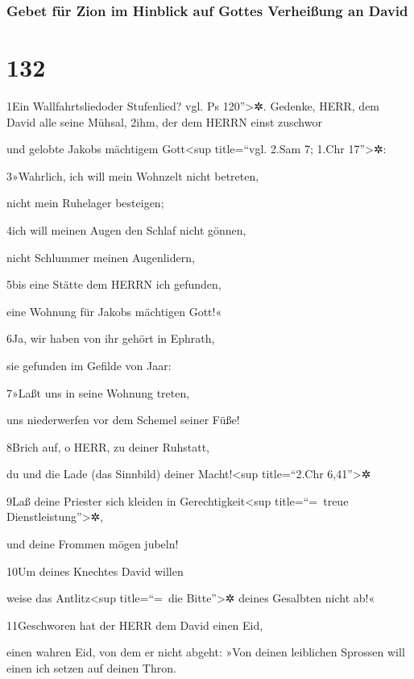 \hypertarget{gebet-fuxfcr-zion-im-hinblick-auf-gottes-verheiuxdfung-an-david}{%
\subsubsection{Gebet für Zion im Hinblick auf Gottes Verheißung an
David}\label{gebet-fuxfcr-zion-im-hinblick-auf-gottes-verheiuxdfung-an-david}}

\hypertarget{section-131}{%
\section{132}\label{section-131}}

1Ein Wallfahrtsliedoder Stufenlied? vgl. Ps 120''\textgreater✲. Gedenke,
HERR, dem David alle seine Mühsal, 2ihm, der dem HERRN einst zuschwor

und gelobte Jakobs mächtigem Gott\textless sup title=``vgl. 2.Sam 7;
1.Chr 17''\textgreater✲:

3»Wahrlich, ich will mein Wohnzelt nicht betreten,

nicht mein Ruhelager besteigen;

4ich will meinen Augen den Schlaf nicht gönnen,

nicht Schlummer meinen Augenlidern,

5bis eine Stätte dem HERRN ich gefunden,

eine Wohnung für Jakobs mächtigen Gott!«

6Ja, wir haben von ihr gehört in Ephrath,

sie gefunden im Gefilde von Jaar:

7»Laßt uns in seine Wohnung treten,

uns niederwerfen vor dem Schemel seiner Füße!

8Brich auf, o HERR, zu deiner Ruhstatt,

du und die Lade (das Sinnbild) deiner Macht!\textless sup title=``2.Chr
6,41''\textgreater✲

9Laß deine Priester sich kleiden in Gerechtigkeit\textless sup
title=``=~treue Dienstleistung''\textgreater✲,

und deine Frommen mögen jubeln!

10Um deines Knechtes David willen

weise das Antlitz\textless sup title=``=~die Bitte''\textgreater✲ deines
Gesalbten nicht ab!«

11Geschworen hat der HERR dem David einen Eid,

einen wahren Eid, von dem er nicht abgeht: »Von deinen leiblichen
Sprossen will einen ich setzen auf deinen Thron.

